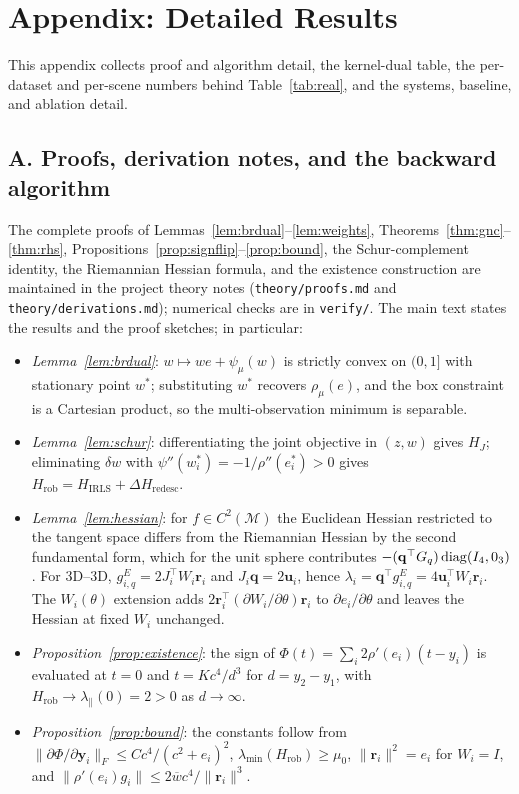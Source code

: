 \section*{Appendix: Detailed Results}
\label{app:start}

This appendix collects proof and algorithm detail, the kernel-dual table, the per-dataset and
per-scene numbers behind Table~\ref{tab:real}, and the systems, baseline, and ablation detail.

\subsection*{A. Proofs, derivation notes, and the backward algorithm}
\label{app:proofs}
\label{app:backward}

The complete proofs of Lemmas~\ref{lem:brdual}--\ref{lem:weights},
Theorems~\ref{thm:gnc}--\ref{thm:rhs}, Propositions~\ref{prop:signflip}--\ref{prop:bound}, the
Schur-complement identity, the Riemannian Hessian formula, and the existence construction are
maintained in the project theory notes (\texttt{theory/proofs.md} and
\texttt{theory/derivations.md}); numerical checks are in \texttt{verify/}. The main text states the
results and the proof sketches; in particular:

\begin{itemize}
\item \emph{Lemma~\ref{lem:brdual}}: $w\mapsto we+\psi_\mu(w)$ is strictly convex on $(0,1]$ with
  stationary point $w^*$; substituting $w^*$ recovers $\rho_\mu(e)$, and the box constraint is a
  Cartesian product, so the multi-observation minimum is separable.
\item \emph{Lemma~\ref{lem:schur}}: differentiating the joint objective in $(z,w)$ gives $H_J$;
  eliminating $\delta w$ with $\psi''(w_i^*)=-1/\rho''(e_i^*)>0$ gives
  $H_{\mathrm{rob}}=H_{\mathrm{IRLS}}+\Delta H_{\mathrm{redesc}}$.
\item \emph{Lemma~\ref{lem:hessian}}: for $f\in C^2(\mathcal{M})$ the Euclidean Hessian restricted
  to the tangent space differs from the Riemannian Hessian by the second fundamental form, which for
  the unit sphere contributes $-(\mathbf{q}^\top G_q)\operatorname{diag}(I_4,0_3)$ \cite{absil2008}. For 3D--3D,
  $g_{i,q}^E=2J_i^\top W_i\mathbf{r}_i$ and $J_i\mathbf{q}=2\mathbf{u}_i$, hence
  $\lambda_i=\mathbf{q}^\top g_{i,q}^E=4\mathbf{u}_i^\top W_i\mathbf{r}_i$. The $W_i(\theta)$
  extension adds $2\mathbf{r}_i^\top(\partial W_i/\partial\theta)\mathbf{r}_i$ to
  $\partial e_i/\partial\theta$ and leaves the Hessian at fixed $W_i$ unchanged.
\item \emph{Proposition~\ref{prop:existence}}: the sign of
  $\Phi(t)=\sum_i2\rho'(e_i)(t-y_i)$ is evaluated at $t=0$ and $t=Kc^4/d^3$ for $d=y_2-y_1$, with
  $H_{\mathrm{rob}}\to\lambda_\parallel(0)=2>0$ as $d\to\infty$.
\item \emph{Proposition~\ref{prop:bound}}: the constants follow from
  $\|\partial\Phi/\partial\mathbf{y}_i\|_F\le Cc^4/(c^2+e_i)^2$,
  $\lambda_{\min}(H_{\mathrm{rob}})\ge\mu_0$, $\|\mathbf{r}_i\|^2=e_i$ for $W_i=I$, and
  $\|\rho'(e_i)g_i\|\le2\overline wc^4/\|\mathbf{r}_i\|^3$.
\end{itemize}

